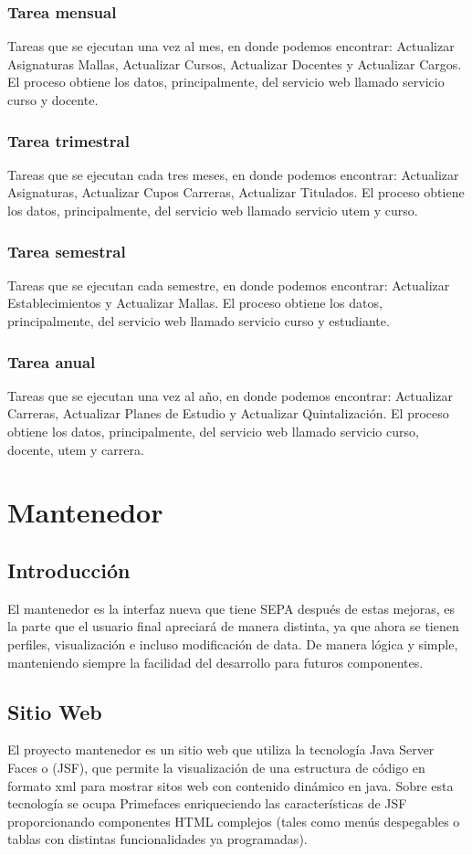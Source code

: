 \documentclass[a4paper,12pt,openany,oneside]{book}
\begin{document}
\subsection{Tarea mensual}
Tareas que se ejecutan una vez al mes, en donde podemos encontrar: Actualizar Asignaturas Mallas, Actualizar Cursos, Actualizar Docentes y Actualizar Cargos. El proceso obtiene los datos, principalmente, del servicio web llamado servicio curso y docente.
\subsection{Tarea trimestral}
Tareas que se ejecutan cada tres meses, en donde podemos encontrar: Actualizar Asignaturas, Actualizar Cupos Carreras, Actualizar Titulados. El proceso obtiene los datos, principalmente, del servicio web llamado servicio utem y curso.
\subsection{Tarea semestral}
Tareas que se ejecutan cada semestre, en donde podemos encontrar: Actualizar Establecimientos y Actualizar Mallas. El proceso obtiene los datos, principalmente, del servicio web llamado servicio curso y estudiante.
\subsection{Tarea anual}
Tareas que se ejecutan una vez al año, en donde podemos encontrar: Actualizar Carreras, Actualizar Planes de Estudio y Actualizar Quintalización. El proceso obtiene los datos, principalmente, del servicio web llamado servicio curso, docente, utem y carrera.

\chapter{Mantenedor}
\thispagestyle{empty}
\section{Introducción}

El mantenedor es la interfaz nueva que tiene SEPA después de estas mejoras, es la parte que el usuario final apreciará de manera distinta, ya que ahora se tienen perfiles, visualización e incluso modificación de data. De manera lógica y simple, manteniendo siempre la facilidad del desarrollo para futuros componentes.

\section{Sitio Web}
El proyecto mantenedor es un sitio web que utiliza la tecnología Java Server Faces o (JSF), que permite la visualización de una estructura de código en formato xml para mostrar sitos web con contenido dinámico en java. Sobre esta tecnología se ocupa Primefaces enriqueciendo las características de JSF proporcionando componentes HTML complejos (tales como menús despegables o tablas con distintas funcionalidades ya programadas).
\end{document}
